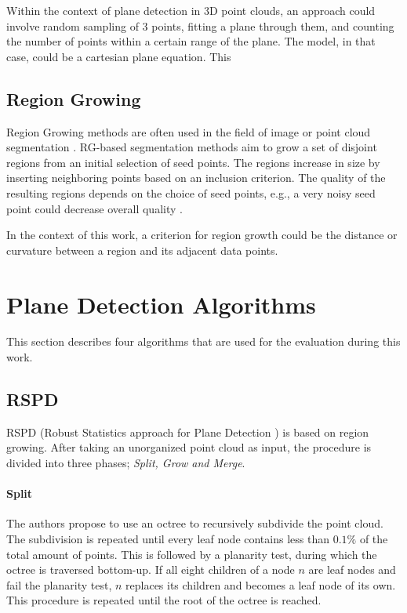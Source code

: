 \documentclass[main.tex]{subfiles}
\begin{document}
Within the context of plane detection in 3D point clouds, an approach could involve random sampling of 3 points, fitting a plane through them,
and counting the number of points within a certain range of the plane\cite{Yang_Forstner}. The model, in that case, could be a cartesian plane equation. This

\subsection*{Region Growing}
Region Growing methods are often used in the field of image or point cloud segmentation \cite{Proença_Gao_2018, Vo_Truong-Hong_Laefer_Bertolotto_2015}.
RG-based segmentation methods aim to grow a set of disjoint regions from an initial selection of seed points. The regions increase in size by inserting neighboring points based on an inclusion criterion.
The quality of the resulting regions depends on the choice of seed points, e.g., a very noisy seed point could decrease overall quality  \cite{Malek_Rahman_Yasiran_Jumaat_Jalil_2012}.

In the context of this work, a criterion for region growth could be the distance or curvature between a region and its adjacent data points.

\section{Plane Detection Algorithms}
This section describes four algorithms that are used for the evaluation during this work.

\subsection{RSPD}
RSPD (Robust Statistics approach for Plane Detection \cite{Araújo_Oliveira_2020}) is based on region growing. After taking an unorganized point cloud as input, the procedure is divided into three phases;
\textit{Split, Grow and Merge}.

\paragraph*{Split}
The authors propose to use an octree to recursively subdivide the point cloud. The subdivision is repeated until every leaf node contains less than $0.1\%$ of the total amount
of points.
This is followed by a planarity test, during which the octree is traversed bottom-up. If all eight children of a node $n$ are leaf nodes and fail the planarity test, $n$ replaces its children
and becomes a leaf node of its own. This procedure is repeated until the root of the octree is reached.
\end{document}
